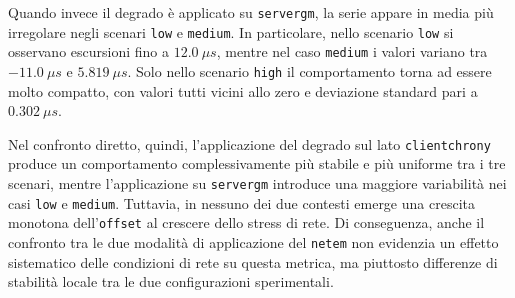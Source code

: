 Quando invece il degrado è applicato su \texttt{servergm}, la serie appare in
media più irregolare negli scenari \texttt{low} e \texttt{medium}. In particolare,
nello scenario \texttt{low} si osservano escursioni fino a $12.0~\mu s$, mentre
nel caso \texttt{medium} i valori variano tra $-11.0~\mu s$ e $5.819~\mu s$.
Solo nello scenario \texttt{high} il comportamento torna ad essere molto compatto,
con valori tutti vicini allo zero e deviazione standard pari a $0.302~\mu s$.

Nel confronto diretto, quindi, l’applicazione del degrado sul lato \texttt{clientchrony}
produce un comportamento complessivamente più stabile e più uniforme tra i tre scenari,
mentre l’applicazione su \texttt{servergm} introduce una maggiore variabilità nei
casi \texttt{low} e \texttt{medium}. Tuttavia, in nessuno dei due contesti emerge
una crescita monotona dell’\texttt{offset} al crescere dello stress di rete. Di
conseguenza, anche il confronto tra le due modalità di applicazione del \texttt{netem}
non evidenzia un effetto sistematico delle condizioni di rete su questa metrica, ma
piuttosto differenze di stabilità locale tra le due configurazioni sperimentali.


